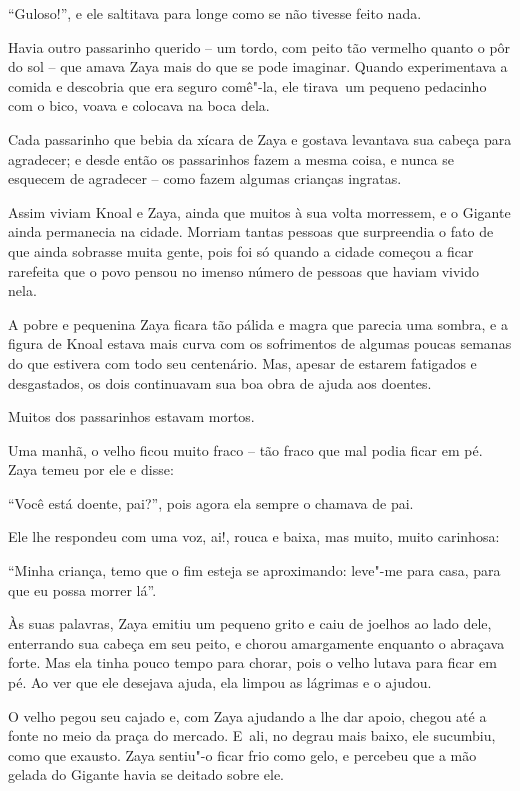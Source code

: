``Guloso!'', e ele saltitava para longe como se não tivesse feito nada.

Havia outro passarinho querido -- um tordo, com peito tão vermelho
quanto o pôr do sol -- que amava Zaya mais do que se pode imaginar.
Quando experimentava a comida e descobria que era seguro comê"-la, ele
tirava~um pequeno pedacinho com o bico, voava e colocava na boca dela.

Cada passarinho que bebia da xícara de Zaya e gostava levantava sua
cabeça para agradecer; e desde então os passarinhos fazem a mesma coisa,
e nunca se esquecem de agradecer -- como fazem algumas crianças
ingratas.

Assim viviam Knoal e Zaya, ainda que muitos à sua volta morressem, e o
Gigante ainda permanecia na cidade. Morriam tantas pessoas que
surpreendia o fato de que ainda sobrasse muita gente, pois foi só quando
a cidade começou a ficar rarefeita que o povo pensou no imenso número de
pessoas que haviam vivido nela.

A pobre e pequenina Zaya ficara tão pálida e magra que parecia uma
sombra, e a figura de Knoal estava mais curva com os sofrimentos de
algumas poucas semanas do que estivera com todo seu centenário. Mas,
apesar de estarem fatigados e desgastados, os dois continuavam sua boa
obra de ajuda aos doentes.

Muitos dos passarinhos estavam mortos.

Uma manhã, o velho ficou muito fraco -- tão fraco que mal podia ficar em
pé. Zaya temeu por ele e disse:

``Você está doente, pai?'', pois agora ela sempre o chamava de pai.

Ele lhe respondeu com uma voz, ai!, rouca e baixa, mas muito, muito
carinhosa:

``Minha criança, temo que o fim esteja se aproximando: leve"-me para
casa, para que eu possa morrer lá''.

Às suas palavras, Zaya emitiu um pequeno grito e caiu de joelhos ao lado
dele, enterrando sua cabeça em seu peito, e chorou amargamente enquanto
o abraçava forte. Mas ela tinha pouco tempo para chorar, pois o velho
lutava para ficar em pé. Ao ver que ele desejava ajuda, ela limpou as
lágrimas e o ajudou.

O velho pegou seu cajado e, com Zaya ajudando a lhe dar apoio, chegou
até a fonte no meio da praça do mercado. E~ali, no degrau mais baixo,
ele sucumbiu, como que exausto. Zaya sentiu"-o ficar frio como gelo, e
percebeu que a mão gelada do Gigante havia se deitado sobre ele.

